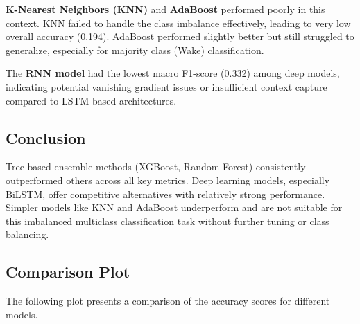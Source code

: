 \textbf{K-Nearest Neighbors (KNN)} and \textbf{AdaBoost} performed poorly in this context. KNN failed to handle the class imbalance effectively, leading to very low overall accuracy (0.194). AdaBoost performed slightly better but still struggled to generalize, especially for majority class (Wake) classification.

The \textbf{RNN model} had the lowest macro F1-score (0.332) among deep models, indicating potential vanishing gradient issues or insufficient context capture compared to LSTM-based architectures.

\subsection{Conclusion}

Tree-based ensemble methods (XGBoost, Random Forest) consistently outperformed others across all key metrics. Deep learning models, especially BiLSTM, offer competitive alternatives with relatively strong performance. Simpler models like KNN and AdaBoost underperform and are not suitable for this imbalanced multiclass classification task without further tuning or class balancing.



\subsection{Comparison Plot}
The following plot presents a comparison of the accuracy scores for different models.

